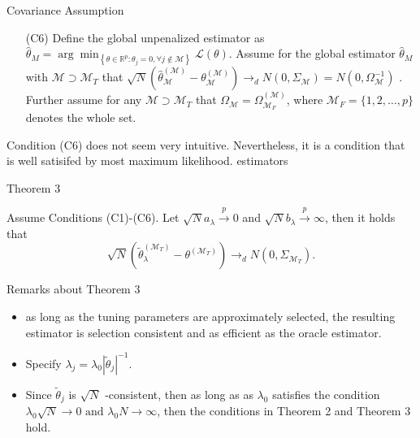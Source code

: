 \documentclass[11pt]{beamer}
\begin{document}
\begin{frame}{Covariance Assumption}
\begin{itemize}
\item[(C6)] Define the global unpenalized estimator as $\hat{\theta}_M = \arg \min _{\left\{\theta \in \mathbb{R}^{p}: \theta_{j}=0, \forall j \notin \mathcal{M}\right\}} \mathcal{L}(\theta)$. Assume for the global estimator $\hat{\theta}_M$ with $ \mathcal{M} \supset \mathcal{M}_{T}$ that $\sqrt{N}\left(\widehat{\theta}_{\mathcal{M}}^{(\mathcal{M})}-\theta_{\mathcal{M}}^{(\mathcal{M})}\right) \rightarrow_{d} N\left(0, \Sigma_{\mathcal{M}}\right)=N\left(0, \Omega_{\mathcal{M}}^{-1}\right)$ . Further assume for any $\mathcal{M} \supset \mathcal{M}_{T}$ that $\Omega_{\mathcal{M}}=\Omega_{\mathcal{M}_{F}}^{(\mathcal{M})}$, where $\mathcal{M}_F=\{1,2,\ldots,p\}$ denotes the whole set.
\end{itemize}

Condition (C6) does not seem very intuitive. Nevertheless, it is a condition that is well satisifed by most maximum likelihood. estimators
\end{frame}

\begin{frame}{Theorem 3}

Assume Conditions (C1)-(C6). Let $\sqrt{N}a_{\lambda}\stackrel{p}{\to} 0$ and $\sqrt{N}b_{\lambda} \stackrel{p}{\to} \infty$, then it holds that
$$
\sqrt{N}\left(\widetilde{\theta}_{\lambda}^{\left(\mathcal{M}_{T}\right)}-\theta^{\left(\mathcal{M}_{T}\right)}\right) \rightarrow_{d} N\left(0, \Sigma_{\mathcal{M}_{T}}\right).
$$
\end{frame}

\begin{frame}{Remarks about Theorem 3}
\begin{itemize}
\item as long as the tuning parameters are approximately
selected, the resulting estimator is selection consistent and as efficient as the
oracle estimator.
\item Specify $\lambda_j=\lambda_0 |\tilde{\theta}_j|^{-1}$.
\item Since $\tilde{\theta}_j$ is $\sqrt{N}$ -consistent, then as long as as $\lambda_0$ satisfies the condition $\lambda_{0} \sqrt{N} \rightarrow 0 \text { and } \lambda_{0} N \rightarrow \infty$, then the conditions in Theorem 2 and Theorem 3 hold.
\end{itemize}
\end{frame}
\end{document}
